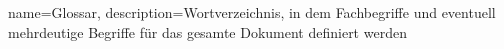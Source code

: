 {
	name=Glossar,
	description={Wortverzeichnis, in dem Fachbegriffe und eventuell mehrdeutige Begriffe für das gesamte Dokument definiert werden}
}